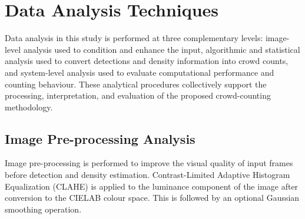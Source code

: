 \documentclass[12pt,a4paper]{report}
\begin{document}



\section{Data Analysis Techniques}

Data analysis in this study is performed at three complementary levels:
image-level analysis used to condition and enhance the input, algorithmic and
statistical analysis used to convert detections and density information into
crowd counts, and system-level analysis used to evaluate computational
performance and counting behaviour. These analytical procedures collectively
support the processing, interpretation, and evaluation of the proposed
crowd-counting methodology.


\subsection{Image Pre-processing Analysis}

Image pre-processing is performed to improve the visual quality of input
frames before detection and density estimation. Contrast-Limited Adaptive
Histogram Equalization (CLAHE) is applied to the luminance component of the
image after conversion to the CIELAB colour space. This is followed by an
optional Gaussian smoothing operation.
\end{document}

